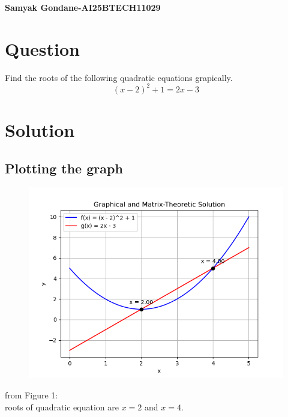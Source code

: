 \documentclass{article}
\begin{document}
\begin{center}
\large
    \textbf{Samyak Gondane-AI25BTECH11029}
\end{center}
\date{}

\section*{Question}
Find the roots of the following quadratic equations grapically.\\
$$(x - 2)^2 + 1 = 2x - 3$$

\section*{Solution}

\subsection*{Plotting the graph}

\begin{figure}[H]
    \centering
    \includegraphics[width=0.5\linewidth]{./figs/Figure_1.png}
    \caption{}
    \label{fig:fig1}
\end{figure}

from Figure 1:\\
roots of quadratic equation are $x = 2$ and $x = 4$.
\end{document}
